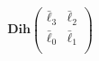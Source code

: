 \documentclass[preview]{standalone}
\begin{document}
\begin{align*}
\mathbf{Dih}\begin{pmatrix}    \bar{\ell}_3 & \bar{\ell}_2\\    \bar{\ell}_0 & \bar{\ell}_1\\\end{pmatrix}
\end{align*}
\end{document}
